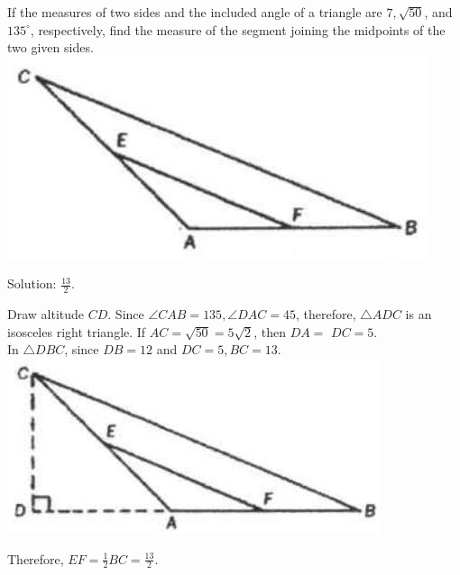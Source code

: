 \documentclass{article}
\begin{document}
If the measures of two sides and the included angle of a triangle are \(7, \sqrt{50}\), and \(135^{\circ}\), respectively, find the measure of the segment joining the midpoints of the two given sides.\\
\centering
\includegraphics[width=\textwidth]{images/078.jpg}

Solution: \(\frac{13}{2}\).


Draw altitude \(C D\). Since \(\angle C A B=135, \angle D A C=45\), therefore, \(\triangle A D C\) is an isosceles right triangle. If \(A C=\sqrt{50}=5 \sqrt{2}\), then \(D A=\) \(D C=5\).\\
In \(\triangle D B C\), since \(D B=12\) and \(D C=5, B C=13\).\\
\centering
\includegraphics[width=\textwidth]{images/079.jpg}

Therefore, \(E F=\frac{1}{2} B C=\frac{13}{2}\).
\end{document}

